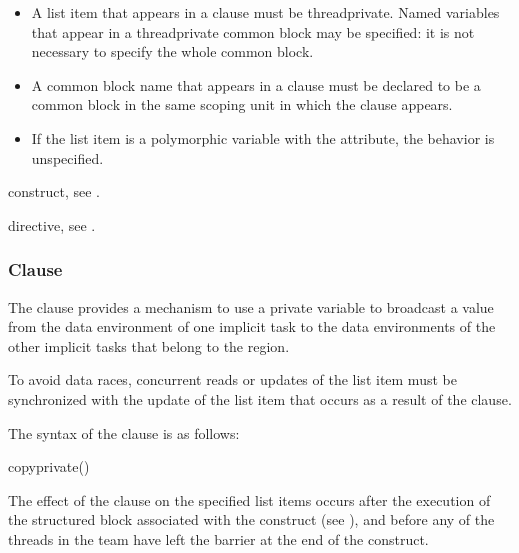 \begin{fortranspecific}
\begin{itemize}
\item A list item that appears in a  clause must be threadprivate. 
      Named variables that appear in a threadprivate common block may be specified: 
      it is not necessary to specify the whole common block.
\item A common block name that appears in a  clause must be declared 
      to be a common block in the same scoping unit in which the  
      clause appears.
\item If the list item is a polymorphic variable with the  
      attribute, the behavior is unspecified.
\end{itemize}
\end{fortranspecific}

\begin{crossrefs}
\item {} construct, see
.

\item {} directive, see
.
\end{crossrefs}



\subsubsection{ Clause}
\label{subsubsec:copyprivate clause}
\summary
The  clause provides a mechanism to use a private variable 
to broadcast a value from the data environment of one implicit task to the data 
environments of the other implicit tasks that belong to the  region.

To avoid data races, concurrent reads or updates of the list item must be
synchronized with the update of the list item that occurs as a result of the
 clause.

\syntax
The syntax of the  clause is as follows:

\begin{ompSyntax}
copyprivate()
\end{ompSyntax}

\descr
The effect of the  clause on the specified list items occurs 
after the execution of the structured block associated with the  
construct (see ), and before any of the threads 
in the team have left the barrier at the end of the construct.

